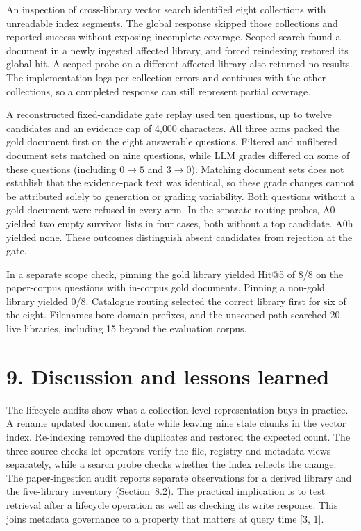 An inspection of cross-library vector search identified eight collections
with unreadable index segments. The global response skipped those
collections and reported success without exposing incomplete coverage.
Scoped search found a document in a newly ingested affected library,
and forced reindexing restored its global hit. A scoped probe on a
different affected library also returned no results. The implementation
logs per-collection errors and continues with the other collections, so
a completed response can still represent partial coverage.

A reconstructed fixed-candidate gate replay used ten questions, up to twelve
candidates and an evidence cap of 4{,}000 characters. All three arms
packed the gold document first on the eight answerable questions.
Filtered and unfiltered document sets matched on nine questions, while
LLM grades differed on some of these questions (including $0\to5$ and
$3\to0$). Matching document sets does not establish that the evidence-pack
text was identical, so these grade changes cannot be attributed solely to
generation or grading variability. Both questions without a gold document
were refused in every
arm. In the separate routing probes, A0 yielded two empty survivor
lists in four cases, both without a top candidate. A0h yielded none.
These outcomes distinguish absent candidates from rejection at the gate.

In a separate scope check, pinning the gold library yielded Hit@5 of
8/8 on the paper-corpus questions with in-corpus gold documents. Pinning a
non-gold library yielded 0/8. Catalogue routing selected the correct
library first for six of the eight. Filenames bore domain prefixes,
and the unscoped path searched 20 live libraries, including 15 beyond
the evaluation corpus.


\section{9. Discussion and lessons learned}


The lifecycle audits show what a collection-level representation buys in
practice. A rename updated document state while leaving nine stale chunks
in the vector index. Re-indexing removed the duplicates and restored the
expected count. The three-source checks let operators verify the file,
registry and metadata views separately, while a search probe checks whether
the index reflects the change. The paper-ingestion audit reports separate
observations for a derived library and the five-library inventory
(Section~8.2). The practical implication is to
test retrieval after a lifecycle operation as well as checking its write
response. This joins metadata governance to a property that matters at
query time [3, 1].

